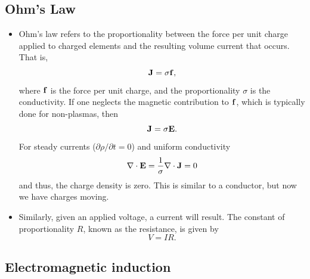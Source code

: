 \documentclass[oneside,a4paper,11pt]{report}
\begin{document}
\subsection{Ohm's Law}
\begin{itemize}
\item Ohm's law refers to the proportionality between the force per unit charge applied to charged elements and the resulting volume current that occurs. That is,
\begin{equation}
\mathbf{J} = \sigma \mathbf{f}, 
\end{equation}
where $\mathbf{f}$ is the force per unit charge, and the proportionality $\sigma$ is the conductivity. If one neglects the magnetic contribution to $\mathbf{f}$, which is typically done for non-plasmas, then
\begin{equation}
\mathbf{J} = \sigma \mathbf{E}.
\end{equation}
For steady currents ($\partial \rho/\partial t = 0$) and uniform conductivity
\begin{equation}
\nabla \cdot \mathbf{E} = \frac{1}{\sigma} \nabla \cdot \mathbf{J} = 0
\end{equation}
 and thus, the charge density is zero. This is similar to a conductor, but now we have charges moving.

\item Similarly, given an applied voltage, a current will result. The constant of proportionality $R$, known as the resistance, is given by 
\begin{equation}
V = IR.
\end{equation}

\end{itemize}

\subsection{Electromagnetic induction}
\end{document}
